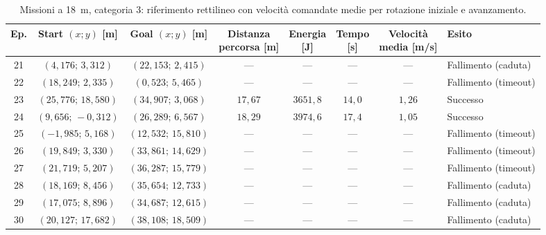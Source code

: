 \begin{table}[H]
\centering
\caption{Missioni a 18~m, categoria 3: riferimento rettilineo con velocità comandate medie per rotazione iniziale e avanzamento.}
\label{tab:big-map-18m-baseline-cat3}
\begingroup
\fontsize{9}{11}\selectfont
\setlength{\tabcolsep}{2.5pt}
\renewcommand{\arraystretch}{1.2}
\begin{tabular}{@{}c cc cccc l@{}}
\toprule
Ep. & \shortstack{Start $(x;y)$\\{}[m]} & \shortstack{Goal $(x;y)$\\{}[m]} & \shortstack{Distanza\\percorsa [m]} & \shortstack{Energia\\{}[J]} & \shortstack{Tempo\\{}[s]} & \shortstack{Velocità\\media [m/s]} & Esito \\
\midrule
21 & $(4{,}176;\,3{,}312)$ & $(22{,}153;\,2{,}415)$ & --- & --- & --- & --- & Fallimento (caduta) \\
22 & $(18{,}249;\,2{,}335)$ & $(0{,}523;\,5{,}465)$ & --- & --- & --- & --- & Fallimento (timeout) \\
23 & $(25{,}776;\,18{,}580)$ & $(34{,}907;\,3{,}068)$ & $17{,}67$ & $3651{,}8$ & $14{,}0$ & $1{,}26$ & Successo \\
24 & $(9{,}656;\,-0{,}312)$ & $(26{,}289;\,6{,}567)$ & $18{,}29$ & $3974{,}6$ & $17{,}4$ & $1{,}05$ & Successo \\
25 & $(-1{,}985;\,5{,}168)$ & $(12{,}532;\,15{,}810)$ & --- & --- & --- & --- & Fallimento (timeout) \\
26 & $(19{,}849;\,3{,}330)$ & $(33{,}861;\,14{,}629)$ & --- & --- & --- & --- & Fallimento (timeout) \\
27 & $(21{,}719;\,5{,}207)$ & $(36{,}287;\,15{,}779)$ & --- & --- & --- & --- & Fallimento (timeout) \\
28 & $(18{,}169;\,8{,}456)$ & $(35{,}654;\,12{,}733)$ & --- & --- & --- & --- & Fallimento (caduta) \\
29 & $(17{,}075;\,8{,}896)$ & $(34{,}687;\,12{,}615)$ & --- & --- & --- & --- & Fallimento (caduta) \\
30 & $(20{,}127;\,17{,}682)$ & $(38{,}108;\,18{,}509)$ & --- & --- & --- & --- & Fallimento (caduta) \\
\bottomrule
\end{tabular}
\endgroup
\end{table}


